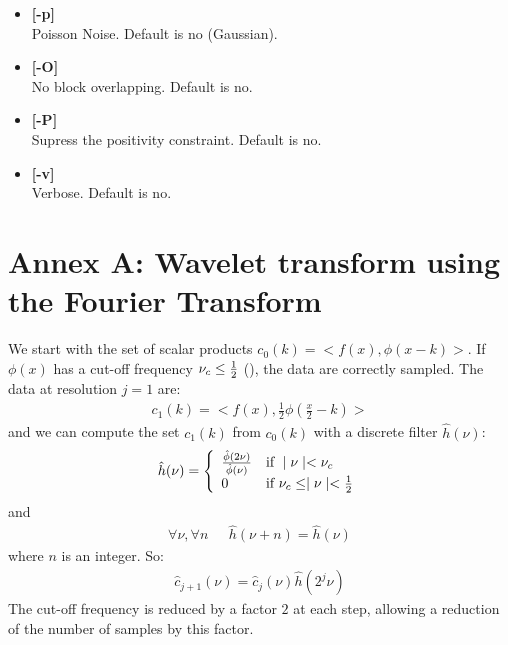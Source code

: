 \documentclass[11pt,a4paper]{article}
\begin{document}
\begin{itemize}
\item {\bf [-p]} \\
Poisson Noise. Default is no (Gaussian).

\item {\bf [-O]}  \\
No block overlapping. Default is no.

\item {\bf [-P]}  \\
Supress the positivity constraint. Default is no. 

\item {\bf [-v]} \\
Verbose. Default is no.
\end{itemize}

\newpage



\newpage

\section*{Annex A: Wavelet transform  using the Fourier Transform}

We start with the set of scalar products $c_0(k)=<f(x),\phi(x-k)>$. If
$\phi(x)$ has a cut-off frequency $\nu_c\le {1\over 2}$
(\cite{starck:sta94_3,starck:sta94_4,starck:book98}), 
the data are
correctly sampled. The data at resolution $j=1$ are:
\begin{eqnarray}
c_1(k)=<f(x),\frac{1}{2}\phi(\frac{x}{2}-k)>
\end{eqnarray}
and we can  compute the set $c_{1}(k)$ from $c_0(k)$ with a discrete 
filter $\hat h(\nu)$:
\begin{eqnarray}
\hat h(\nu)= \left\{
  \begin{array}{ll}
  {\hat{\phi}(2\nu)\over \hat{\phi}(\nu)} & \mbox{if } \mid \nu \mid < \nu_c \\
0 & \mbox{if } \nu_c  \leq \mid \nu \mid < {1\over 2} 
  \end{array}
  \right.
\end{eqnarray}
and
\begin{eqnarray}
\forall \nu, \forall n \mbox{    } & \hat h(\nu + n) = \hat h(\nu)
\end{eqnarray}
where $n$ is an integer.
So:
\begin{eqnarray}
\hat{c}_{j+1}(\nu)=\hat{c}_{j}(\nu)\hat{h}(2^{j}\nu)
\end{eqnarray}
The cut-off frequency is reduced by a factor $2$ at each step, allowing  a
reduction of the number of samples by this factor.
\end{document}
